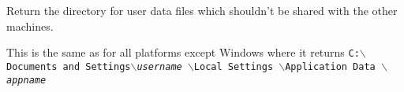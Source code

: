 \label{wxfilelocatorgetuserlocaldatadir}


Return the directory for user data files which shouldn't be shared with
the other machines.

This is the same as  for
all platforms except Windows where it returns 
\texttt{C:$\backslash$Documents and Settings$\backslash$\textit{username}
                             $\backslash$Local Settings
                             $\backslash$Application Data
                             $\backslash$\textit{appname}}


